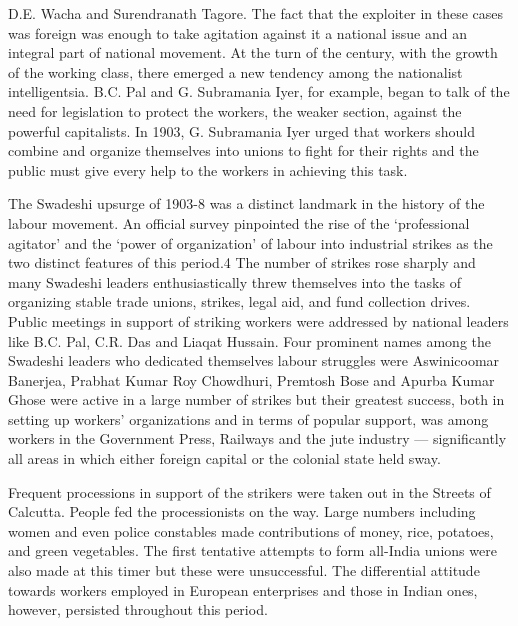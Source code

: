 D.E. Wacha and Surendranath Tagore. The fact that the exploiter in these cases was foreign was enough to take agitation against it a national issue and an integral part of national movement. At the turn of the century, with the growth of the working class, there emerged a new tendency among the nationalist intelligentsia. B.C. Pal and G. Subramania Iyer, for example, began to talk of the need for legislation to protect the workers, the weaker section, against the powerful capitalists. In 1903, G. Subramania Iyer urged that workers should combine and organize themselves into unions to fight for their rights and the public must give every help to the workers in achieving this task.

The Swadeshi upsurge of 1903-8 was a distinct landmark in the history of the labour movement. An official survey pinpointed the rise of the ‘professional agitator’ and the ‘power of organization’ of labour into industrial strikes as the two distinct features of this period.4 The number of strikes rose sharply and many Swadeshi leaders enthusiastically threw themselves into the tasks of organizing stable trade unions, strikes, legal aid, and fund collection drives. Public meetings in support of striking workers were addressed by national leaders like B.C. Pal, C.R. Das and Liaqat Hussain. Four prominent names among the Swadeshi leaders who dedicated themselves labour struggles were Aswinicoomar Banerjea, Prabhat Kumar Roy Chowdhuri, Premtosh Bose and Apurba Kumar Ghose were active in a large number of strikes but their greatest success, both in setting up workers’ organizations and in terms of popular support, was among workers in the Government Press, Railways and the jute industry — significantly all areas in which either foreign capital or the colonial state held sway.

Frequent processions in support of the strikers were taken out in the Streets of Calcutta. People fed the processionists on the way. Large numbers including women and even police constables made contributions of money, rice, potatoes, and green vegetables. The first tentative attempts to form all-India unions were also made at this timer but these were unsuccessful. The differential attitude towards workers employed in European enterprises and those in Indian ones, however, persisted throughout this period.

